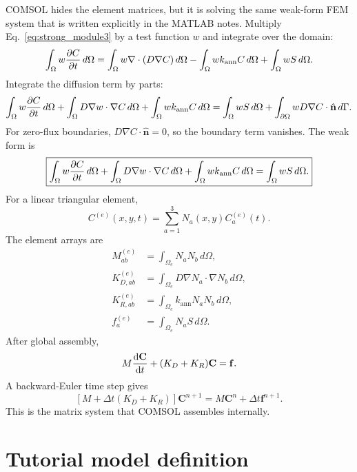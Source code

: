 \documentclass[11pt]{article}
\begin{document}
COMSOL hides the element matrices, but it is solving the same weak-form FEM system that is written explicitly in the MATLAB notes. Multiply Eq.~\eqref{eq:strong_module3} by a test function $w$ and integrate over the domain:
\begin{equation}
\int_{\Omega} w\pdv{C}{t}\,d\Omega
=
\int_{\Omega} w\nabla\cdot(D\nabla C)\,d\Omega
-
\int_{\Omega} w k_{\mathrm{ann}} C\,d\Omega
+
\int_{\Omega} wS\,d\Omega.
\end{equation}
Integrate the diffusion term by parts:
\begin{equation}
\int_{\Omega} w\pdv{C}{t}\,d\Omega
+
\int_{\Omega}D\nabla w\cdot\nabla C\,d\Omega
+
\int_{\Omega}w k_{\mathrm{ann}}C\,d\Omega
=
\int_{\Omega}wS\,d\Omega
+
\int_{\partial\Omega}wD\nabla C\cdot\hat{\mathbf n}\,d\Gamma.
\label{eq:weak_boundary}
\end{equation}
For zero-flux boundaries, $D\nabla C\cdot\hat{\mathbf n}=0$, so the boundary term vanishes. The weak form is
\begin{equation}
\boxed{
\int_{\Omega} w\pdv{C}{t}\,d\Omega
+
\int_{\Omega}D\nabla w\cdot\nabla C\,d\Omega
+
\int_{\Omega}w k_{\mathrm{ann}}C\,d\Omega
=
\int_{\Omega}wS\,d\Omega.
}
\label{eq:weak_module3}
\end{equation}
For a linear triangular element,
\begin{equation}
C^{(e)}(x,y,t)=\sum_{a=1}^{3}N_a(x,y)C_a^{(e)}(t).
\end{equation}
The element arrays are
\begin{align}
M_{ab}^{(e)}&=\int_{\Omega_e}N_aN_b\,d\Omega,\\
K_{D,ab}^{(e)}&=\int_{\Omega_e}D\nabla N_a\cdot\nabla N_b\,d\Omega,\\
K_{R,ab}^{(e)}&=\int_{\Omega_e}k_{\mathrm{ann}}N_aN_b\,d\Omega,\\
f_a^{(e)}&=\int_{\Omega_e}N_aS\,d\Omega.
\end{align}
After global assembly,
\begin{equation}
M\dv{\mathbf C}{t}+(K_D+K_R)\mathbf C=\mathbf f.
\label{eq:semidiscrete}
\end{equation}
A backward-Euler time step gives
\begin{equation}
\boxed{\left[M+\Delta t(K_D+K_R)\right]\mathbf C^{n+1}=M\mathbf C^n+\Delta t\mathbf f^{n+1}.}
\label{eq:be}
\end{equation}
This is the matrix system that COMSOL assembles internally.

\section{Tutorial model definition}
\end{document}
